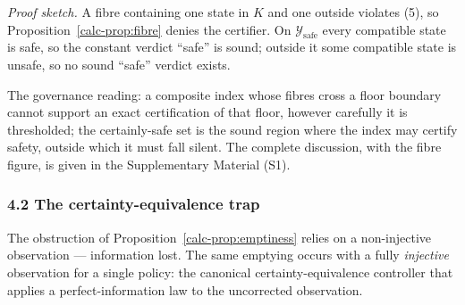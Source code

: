 \documentclass[10pt,twocolumn]{article}
\theoremstyle{definition}
\begin{document}
\emph{Proof sketch.} A fibre containing one state in \(K\) and one outside violates (5), so Proposition~\ref{calc-prop:fibre} denies the certifier. On \(\mathcal{Y}_{\mathrm{safe}}\) every compatible state is safe, so the constant verdict ``safe'' is sound; outside it some compatible state is unsafe, so no sound ``safe'' verdict exists.

The governance reading: a composite index whose fibres cross a floor boundary cannot support an exact certification of that floor, however carefully it is thresholded; the certainly-safe set is the sound region where the index may certify safety, outside which it must fall silent. The complete discussion, with the fibre figure, is given in the Supplementary Material (S1).

\subsubsection{4.2 The certainty-equivalence
trap}\label{calc-the-certainty-equivalence-trap}

The obstruction of Proposition~\ref{calc-prop:emptiness} relies on a non-injective observation ---
information lost. The same emptying occurs with a fully
\emph{injective} observation for a single policy: the canonical
certainty-equivalence controller that applies a perfect-information law
to the uncorrected observation.
\end{document}
